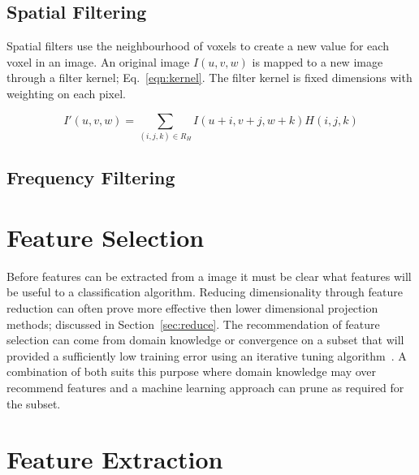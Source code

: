 \documentclass[journal]{IEEEtran}
\begin{document}
\subsection{Spatial Filtering}
Spatial filters use the neighbourhood of voxels to create a new value for each voxel in an image. 
An original image $I(u,v,w)$ is mapped to a new image through a filter kernel; Eq.~\ref{eqn:kernel}.
The filter kernel is fixed dimensions with weighting on each pixel.

\begin{equation}
	I'(u,v,w) = \sum\limits_{(i,j,k) \in R_H} I(u + i,v + j, w + k)H(i,j,k)
	\label{eqn:kernel} 
\end{equation}



\subsection{Frequency Filtering}





\section{Feature Selection}
\label{sec:selection}
Before features can be extracted from a image it must be clear what features will be useful to a classification algorithm.
Reducing dimensionality through feature reduction can often prove more effective then lower dimensional projection methods; discussed in Section~\ref{sec:reduce}.
The recommendation of feature selection can come from domain knowledge or convergence on a subset that will provided a sufficiently low training error using an iterative tuning algorithm~\cite{bu07feature,li10tumor}.
A combination of both suits this purpose where domain knowledge may over recommend features and a machine learning approach can prune as required for the subset.  










\section{Feature Extraction}
\label{sec:extraction}
\end{document}
